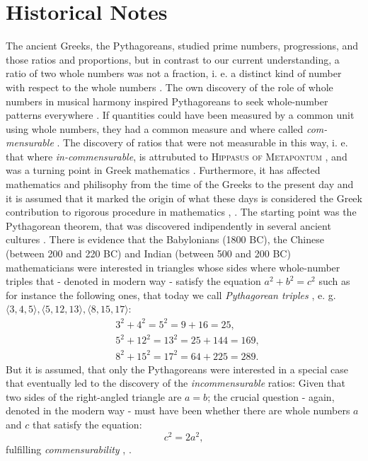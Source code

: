\documentclass[11pt]{amsart}
\theoremstyle{definition}
\begin{document}
\section{Historical Notes}
The ancient Greeks, the Pythagoreans, studied prime numbers, progressions, and those ratios and proportions, but in contrast to our current understanding, a ratio of two whole numbers was not a fraction, i. e. a distinct kind of number with respect to the whole numbers \cite[32]{klineMathematicalThoughtAncient1990}.
The own discovery of the role of whole numbers in musical harmony inspired Pythagoreans to seek whole-number patterns everywhere \cite[11]{stillwellMathematicsItsHistory2010}.
If quantities could have been measured by a common unit using whole numbers, they had a common measure and where called \emph{com-mensurable} \cite[32]{klineMathematicalThoughtAncient1990}.
The discovery of ratios that were not measurable in this way, i. e. that where \emph{in-commensurable}, is attrubuted to \textsc{Hippasus of Metapontum} \cite[32]{klineMathematicalThoughtAncient1990}, and was a turning point in Greek mathematics \cite[1]{stillwellStoryProofLogic2022}. Furthermore, it has affected mathematics and philisophy from the time of the Greeks to the present day \cite[59]{courantWhatMathematicsElementary1996} and it is assumed that it marked the origin of what these days is considered the Greek contribution to rigorous procedure in mathematics \cite[59]{courantWhatMathematicsElementary1996}, \cite[1]{stillwellStoryProofLogic2022}.
The starting point was the Pythagorean theorem, that was discovered indipendently in several ancient cultures \cite[3]{stillwellStoryProofLogic2022}.
There is evidence \cite[4]{stillwellMathematicsItsHistory2010} that the Babylonians (1800 BC), the Chinese (between 200 and 220 BC) and Indian (between 500 and 200 BC) mathematicians were interested in triangles whose sides where whole-number triples that - denoted in modern way - satisfy the equation \(a^{2} + b^{2} = c^{2}\) \cite[3-4]{stillwellStoryProofLogic2022} such as for instance the following ones, that today we call \emph{Pythagorean triples} \cite[4]{stillwellMathematicsItsHistory2010}, e. g. \(\langle 3, 4, 5 \rangle, \langle 5, 12, 13 \rangle, \langle 8, 15, 17 \rangle\):
\begin{align*}
     & 3^{2} + 4^{2}  =  5^{2}  = 9 + 16 = 25,     \\
     & 5^{2} + 12^{2} =  13^{2}  = 25 + 144 = 169, \\
     & 8^{2} + 15^{2} = 17^{2} = 64 + 225 = 289.
\end{align*}
But it is assumed, that only the Pythagoreans were interested in a special case that eventually led to the discovery of the \emph{incommensurable} ratios: Given that two sides of the right-angled triangle are \(a = b\); the crucial question - again, denoted in the modern way - must have been whether there are whole numbers \(a\) and \(c\) that satisfy the equation:
\begin{equation}
    c^{2} = 2a^{2},
\end{equation}
fulfilling \emph{commensurability} \cite[6-7]{stillwellStoryProofLogic2022}, \cite[58]{courantWhatMathematicsElementary1996}. \\
\end{document}
